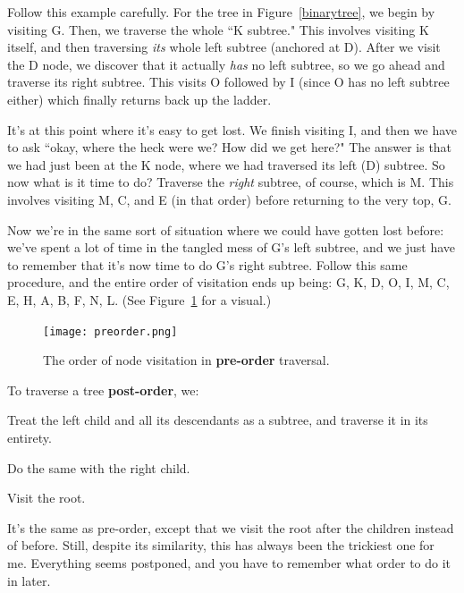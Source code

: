 Follow this example carefully. For the tree in Figure~\ref{binarytree}, we
begin by visiting G. Then, we traverse the whole ``K subtree." This
involves visiting K itself, and then traversing \textit{its} whole left
subtree (anchored at D). After we visit the D node, we discover that it
actually \textit{has} no left subtree, so we go ahead and traverse its
right subtree. This visits O followed by I (since O has no left subtree
either) which finally returns back up the ladder.

It's at this point where it's easy to get lost. We finish visiting I, and
then we have to ask ``okay, where the heck were we? How did we get here?"
The answer is that we had just been at the K node, where we had traversed
its left (D) subtree. So now what is it time to do? Traverse the
\textit{right} subtree, of course, which is M. This involves visiting M, C,
and E (in that order) before returning to the very top, G. 

Now we're in the same sort of situation where we could have gotten lost
before: we've spent a lot of time in the tangled mess of G's left subtree,
and we just have to remember that it's now time to do G's right subtree.
Follow this same procedure, and the entire order of visitation ends up
being: G, K, D, O, I, M, C, E, H, A, B, F, N, L. (See Figure~\ref{preorder}
for a visual.)

\begin{figure}[ht]
\centering
\texttt{[image: preorder.png]}
\caption{The order of node visitation in \textbf{pre-order} traversal.}
\label{preorder}
\end{figure}


\begin{framed}
To traverse a tree \textbf{post-order}, we:
\begin{compactenum}
\item Treat the left child and all its descendants as a subtree, and
traverse it in its entirety.
\item Do the same with the right child.
\item Visit the root.
\end{compactenum}
\end{framed}

It's the same as pre-order, except that we visit the root after the
children instead of before. Still, despite its similarity, this has always
been the trickiest one for me. Everything seems postponed, and you have to
remember what order to do it in later.

